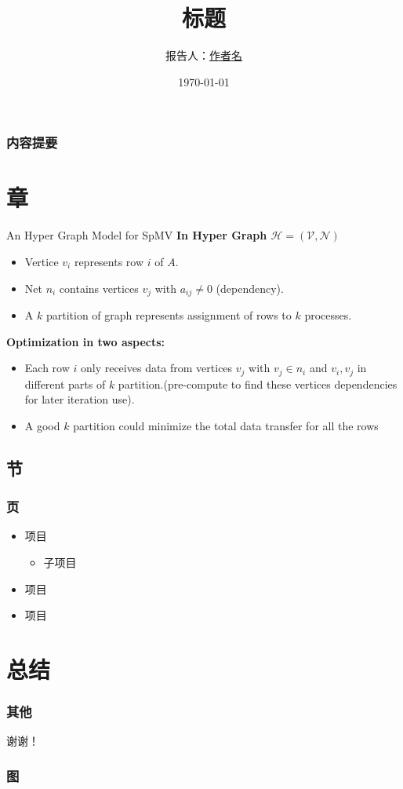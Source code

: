 \documentclass{beamer}
\title{标题}
\author{报告人：\href{mailto:xx@xx.cn}{作者名}}
\institute{机构名}
\date{\today}
\begin{document}
\begin{frame}
	\titlepage
\end{frame}

\begin{frame}
	\frametitle{内容提要}
	\tableofcontents[hideothersubsections]
\end{frame}

\section{章}
\begin{frame}
\end{frame}

\begin{frame}{An Hyper Graph Model for SpMV}
	\textbf{In Hyper Graph $\mathcal{H}=(\mathcal{V},\mathcal{N})$ }
	\vspace*{0.5cm}
	\begin{itemize}
	  \item Vertice $v_i$ represents row $i$ of $A$. 
	  \item Net $n_i$ contains vertices $v_j$ with $a_{ij} \neq 0$ (dependency). 
	  \item A $k$ partition of graph represents assignment of rows to $k$ processes. 
	\end{itemize}
	\vspace*{0.5cm}
	\textbf{Optimization in two aspects:}
	\vspace*{0.5cm}
	\begin{itemize}
	  \item Each row $i$ only receives data from vertices $v_j$ with $v_j \in n_i$ and $v_i, v_j$ in different parts of 
		$k$ partition.(pre-compute to find these vertices dependencies for later iteration use). 
	  \item A good $k$ partition could minimize the total data transfer for all the rows
	\end{itemize}
  \end{frame}

\subsection{节}
\begin{frame}
	\frametitle{页}
	\begin{itemize}[<+-|alert@+>]
		\item 项目
			\begin{itemize}
				\item 子项目
			\end{itemize}
		\item 项目
		\item 项目
	\end{itemize}
\end{frame}

\section{总结}
\begin{frame}
	\frametitle{其他}
	\begin{center}
		\Huge{谢谢！}
	\end{center}
\end{frame}

\begin{frame}
	\frametitle{图}
	\centerline{
	}
	\label{pic}
\end{frame}
  
\end{document}
